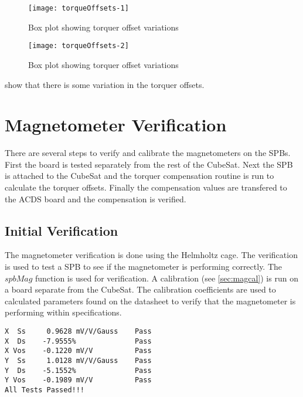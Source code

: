 \begin{figure}[!htb]
    \centering
    \texttt{[image: torqueOffsets-1]}
    \caption{Box plot showing torquer offset variations}
    \label{fig:tqoff1}
\end{figure}

\begin{figure}[!htb]
    \centering
    \texttt{[image: torqueOffsets-2]}
    \caption{Box plot showing torquer offset variations}
    \label{fig:tqoff2}
\end{figure}

 show that there is some variation in the torquer offsets. 

\section{Magnetometer Verification}

There are several steps to verify and calibrate the magnetometers on the \acp{SPB}. First the board is tested separately from the rest of the CubeSat. Next the \ac{SPB} is attached to the CubeSat and the torquer compensation routine is run to calculate the torquer offsets. Finally the compensation values are transfered to the \ac{ACDS} board and the compensation is verified.


\subsection{Initial Verification}

The magnetometer verification is done using the Helmholtz cage. The verification is used to test a \ac{SPB} to see if the magnetometer is performing correctly. The \lstMat$spbMag$ function is used for verification. A calibration (see \cref{sec:magcal}) is run on a board separate from the CubeSat. The calibration coefficients are used to calculated parameters found on the datasheet to verify that the magnetometer is performing within specifications.

\begin{minipage}{\linewidth}
\begin{lstlisting}[caption={\ac{SPB} verification results},label={lst:vspb-res},language=verbatim,style=verbatim]
X  Ss     0.9628 mV/V/Gauss    Pass
X  Ds    -7.9555%              Pass
X Vos    -0.1220 mV/V          Pass
Y  Ss     1.0128 mV/V/Gauss    Pass
Y  Ds    -5.1552%              Pass
Y Vos    -0.1989 mV/V          Pass
All Tests Passed!!!
\end{lstlisting}
\end{minipage}

